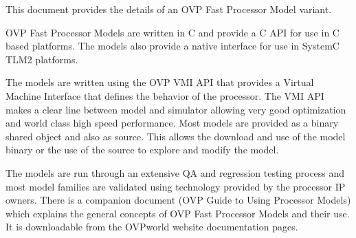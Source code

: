 %
%
%
%
%
This document provides the details of an OVP Fast Processor Model variant.
\par
OVP Fast Processor Models are written in C and provide a C API for use in C based
platforms. The models also provide a native interface for use in SystemC TLM2 platforms.
\par
The models are written using the OVP VMI API that provides a Virtual Machine Interface that defines the behavior of the processor.
The VMI API makes a clear line between model and simulator allowing very good optimization and world class high speed performance.
Most models are provided as a binary shared object and also as source.
This allows the download and use of the model binary or the use of the source to explore and modify the model.
\par
The models are run through an extensive QA and regression testing process and most model families are validated using technology provided by the processor IP owners.
There is a companion document (OVP Guide to Using Processor Models) which explains the general concepts of OVP Fast Processor Models and their use.
It is downloadable from the OVPworld website documentation pages.
\par
\setlength{\parindent}{0pt}

